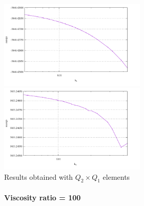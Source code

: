 \begin{center}
\includegraphics[width=7cm]{python_codes/fieldstone_25/results/min_p_010.pdf}
\includegraphics[width=7cm]{python_codes/fieldstone_25/results/max_p_010.pdf}\\
{\captionfont Results obtained with $Q_2\times Q_1$ elements} 
\end{center}

\newpage
\paragraph{Viscosity ratio = 100}

